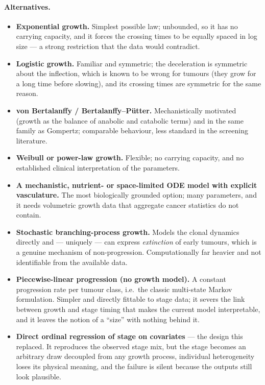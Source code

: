 \documentclass[12pt,a4paper]{article}
\newcommand{\alt}[1]{\paragraph{Alternatives.} #1}
\begin{document}
\alt{\begin{itemize}[nosep]
  \item \textbf{Exponential growth.} Simplest possible law; unbounded, so it has no carrying capacity, and
        it forces the crossing times to be equally spaced in log size --- a strong restriction that the
        data would contradict.
  \item \textbf{Logistic growth.} Familiar and symmetric; the deceleration is symmetric about the
        inflection, which is known to be wrong for tumours (they grow for a long time before slowing),
        and its crossing times are symmetric for the same reason.
  \item \textbf{von Bertalanffy / Bertalanffy--Pütter.} Mechanistically motivated (growth as the balance of
        anabolic and catabolic terms) and in the same family as Gompertz; comparable behaviour, less
        standard in the screening literature.
  \item \textbf{Weibull or power-law growth.} Flexible; no carrying capacity, and no established clinical
        interpretation of the parameters.
  \item \textbf{A mechanistic, nutrient- or space-limited ODE model with explicit vasculature.} The most
        biologically grounded option; many parameters, and it needs volumetric growth data that aggregate
        cancer statistics do not contain.
  \item \textbf{Stochastic branching-process growth.} Models the clonal dynamics directly and --- uniquely
        --- can express \emph{extinction} of early tumours, which is a genuine mechanism of
        non-progression. Computationally far heavier and not identifiable from the available data.
  \item \textbf{Piecewise-linear progression (no growth model).} A constant progression rate per tumour
        class, i.e.\ the classic multi-state Markov formulation. Simpler and directly fittable to stage
        data; it severs the link between growth and stage timing that makes the current model
        interpretable, and it leaves the notion of a ``size'' with nothing behind it.
  \item \textbf{Direct ordinal regression of stage on covariates} --- the design this replaced. It
        reproduces the observed stage mix, but the stage becomes an arbitrary draw decoupled from any
        growth process, individual heterogeneity loses its physical meaning, and the failure is silent
        because the outputs still look plausible.
\end{itemize}}
\end{document}
